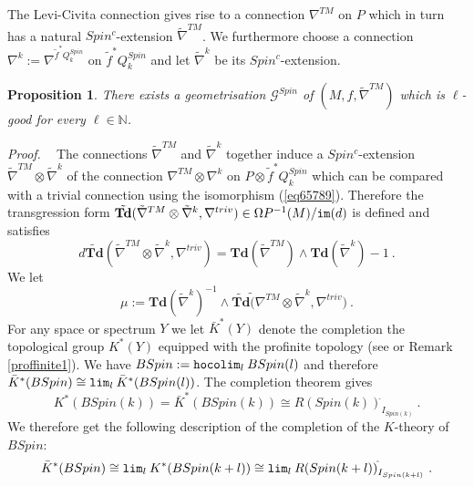 \documentclass[12pt]{article}
\newtheorem{prop}[theorem]{Proposition}
\newcommand{\hocolim}{{\tt hocolim}}
\newcommand{\im}{{\tt im}}
\newcommand{\cG}{{\mathcal{G}}}
\newcommand{\proof}{{\it Proof.$\:\:\:\:$}}
\newcommand{\nat}{{\mathbb{N}}}
\newcommand{\Td}{{\mathbf{Td}}}
\renewcommand{\lim}{{\tt lim}}
\begin{document}
The Levi-Civita connection gives rise to a connection $\nabla^{TM}$ on $P$ which in turn has a natural  $Spin^{c}$-extension $\tilde \nabla^{TM}$.
We furthermore choose a connection $\nabla^{k}:=\nabla^{\tilde f^{*}Q^{Spin}_{k}}$ on $\tilde f^{*}Q^{Spin}_{k}$ and let $\tilde \nabla^{k}$ be its $Spin^{c}$-extension.
\begin{prop}\label{lem77}
There exists a  geometrisation $\cG^{Spin}$ of
$(M,f,\tilde \nabla^{TM})$ which is $\ell$-good for every $\ell\in \nat$.
\end{prop}
\proof
The connections $\tilde \nabla^{TM}$ and $\tilde \nabla^{k}$ together induce a $Spin^{c}$-extension 
$\tilde \nabla^{TM}\otimes \tilde \nabla^{k}$
of the connection $\nabla^{TM}\otimes \nabla^{k}$ 
on $P\otimes \tilde f^{*}Q^{Spin}_{k}$ which can be compared with a trivial connection using the isomorphism
(\ref{eq65789}). Therefore the transgression form
$\tilde \Td(\tilde \nabla^{TM}\otimes\tilde  \nabla^{k},\nabla^{triv})\in \Omega P^{-1}(M)/\im(d)$ is defined and
satisfies
$$d\tilde \Td(\tilde \nabla^{TM}\otimes \tilde \nabla^{k},\nabla^{triv})=\Td(\tilde \nabla^{TM})\wedge \Td(\tilde \nabla^{k})-1\ .$$
We let
\begin{equation}\label{eq87100v}\mu:= \Td(\tilde \nabla^{k})^{-1}\wedge \tilde \Td\tilde (\nabla^{TM}\otimes \tilde \nabla^{k},\nabla^{triv})\ .\end{equation}
For any space or spectrum $Y$ we let
$\bar K^{*}(Y)$ denote the completion  the topological group $K^{*}(Y)$ equipped with the profinite topology (see  \cite[Def. 4.9] {MR1361899} or Remark \ref{proffinite1}).
We have $BSpin:=\hocolim_{l} \: BSpin(l)$ and therefore  $\bar K^{*}(BSpin)\cong \lim_{l}\: \bar K^{*}(BSpin(l))$.
The completion theorem \cite{MR0259946} gives
$$ K^{*}(BSpin(k))= \bar K^{*}(BSpin(k))\cong  R(Spin(k))^{\hat{}}_{I_{Spin(k)}}\ .$$
We therefore get the following description of the completion of the $K$-theory of $BSpin$:
$$\bar K^{*}(BSpin)\cong \lim_{l} \: K^{*}(BSpin(k+l))\cong \lim_{l}\: R(Spin(k+l))^{\hat{}}_{I_{Spin(k+l)}}\ .$$
 
\end{document}
